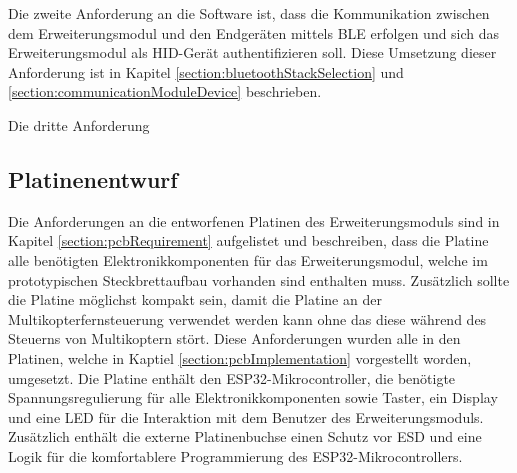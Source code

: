 Die zweite Anforderung an die Software ist, dass die Kommunikation zwischen dem Erweiterungsmodul und den Endgeräten mittels \ac{BLE} erfolgen und sich das Erweiterungsmodul als HID-Gerät authentifizieren soll. Diese Umsetzung dieser Anforderung ist in Kapitel \ref{section:bluetoothStackSelection} und \ref{section:communicationModuleDevice} beschrieben.

Die dritte Anforderung 





\subsection{Platinenentwurf}
Die Anforderungen an die entworfenen Platinen des Erweiterungsmoduls sind in Kapitel \ref{section:pcbRequirement} aufgelistet und beschreiben, dass die Platine alle benötigten Elektronikkomponenten für das Erweiterungsmodul, welche im prototypischen Steckbrettaufbau vorhanden sind enthalten muss. Zusätzlich sollte die Platine möglichst kompakt sein, damit die Platine an der Multikopterfernsteuerung verwendet werden kann ohne das diese während des Steuerns von Multikoptern stört. Diese Anforderungen wurden alle in den Platinen, welche in Kaptiel \ref{section:pcbImplementation} vorgestellt worden, umgesetzt. Die Platine enthält den ESP32-Mikrocontroller, die benötigte Spannungsregulierung für alle Elektronikkomponenten sowie Taster, ein Display und eine LED für die Interaktion mit dem Benutzer des Erweiterungsmoduls. Zusätzlich enthält die externe Platinenbuchse einen Schutz vor \ac{ESD} und eine Logik für die komfortablere Programmierung des ESP32-Mikrocontrollers.

